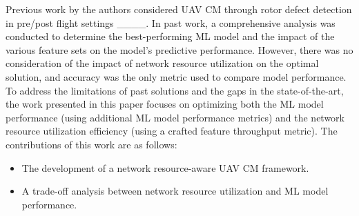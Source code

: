 Previous work by the authors considered UAV CM through rotor defect detection in pre/post flight settings ____. In past work, a comprehensive analysis was conducted to determine the best-performing ML model and the impact of the various feature sets on the model's predictive performance. However, there was no consideration of the impact of network resource utilization on the optimal solution, and accuracy was the only metric used to compare model performance. To address the limitations of past solutions and the gaps in the state-of-the-art, the work presented in this paper focuses on optimizing both the ML model performance (using additional ML model performance metrics) and the network resource utilization efficiency (using a crafted feature throughput metric).
The contributions of this work are as follows:
\begin{itemize}
    \item The development of a network resource-aware UAV CM framework.
    \item A trade-off analysis between network resource utilization and ML model performance.
\end{itemize}